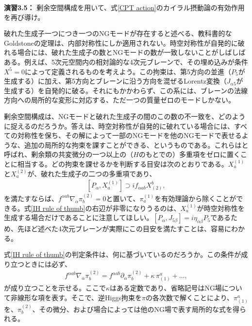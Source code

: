 %
%
\begin{eBox}
%
{\bf 演習3.5：} 剰余空間構成を用いて、式\eqref{CPT action}のカイラル摂動論の有効作用を再び導け。
%
\end{eBox}
%




破れた生成子一つにつき一つのNGモードが存在すると述べる、教科書的なGoldstoneの定理は、内部対称性にしか適用されない。時空対称性が自発的に破れる場合には、破れた生成子の数とNGモードの数が一致しないことがしばしばある。例えば、5次元空間内の相対論的な4次元ブレーンで、その埋め込みが条件$X^5 = 0$によって定義されるものを考えよう。この拘束は、第5方向の並進（$P_5$が生成する）に加え、第5方向とブレーンに沿う方向を混ぜるLorentz変換（$J_{\alpha 5}$が生成する）を自発的に破る。それにもかかわらず、この系には、ブレーンの法線方向への局所的な変形に対応する、ただ一つの質量ゼロのモードしかない。

剰余空間構成は、NGモードと破れた生成子の間のこの数の不一致を、どのように捉えるのだろうか。答えは、時空対称性が自発的に破れている場合には、すべての対称性を保ち、その解によって一部のNGモードを他のNGモードで表せるような、追加の局所的な拘束を課すことができる、というものである。これらはと呼ばれ、剰余類の共変微分の一つ以上の（$H$のもとでの）多重項をゼロに置くことに相当する。どの拘束を課せるかを判断する目安は次のとおりである。$X_a^{(1)}$と$X_a^{(2)}$が、破れた生成子の二つの多重項であり、
%
\begin{align} \label{IH rule of thumb}
	[P_\alpha, X_a^{(1)}] \supset i f_{\alpha a b} X^b_{(2)} ,
\end{align}
%
を満たすならば、$f^{\alpha a b} \nabla_\alpha \pi_b^{(2)} = 0$と置いて、$\pi_a^{(1)}$を有効理論から除くことができる。式\eqref{IH rule of thumb}の右辺が非零になりうるのは、$X_a^{(1)}$が時空対称性を生成する場合だけであることに注意してほしい。$[P_\alpha, J_{5 \beta}] = i \eta_{\alpha \beta} P_5$であるため、先ほど述べた4次元ブレーンが実際にこの目安を満たすことは、容易にわかる。

式\eqref{IH rule of thumb}の判定条件は、何に基づいているのだろうか。この条件が成り立つときには必ず、
%
\begin{align} \label{IH constraint}
	f^{\alpha a b} \nabla_\alpha \pi_b^{(2)} =  f^{\alpha a b} \partial_\alpha \pi_b^{(2)} + \kappa \, \pi^a_{(1)} +\dots , 
\end{align}
%
が成り立つことを示せる。ここで$\kappa$はある定数であり、省略記号はNG場について非線形な項を表す。そこで、逆Higgs拘束を$\pi$の各次数で解くことにより、$\pi^a_{(1)}$を、$\pi_b^{(2)}$、その微分、および場合によっては他のNG場で表す局所的な式を得られる。

